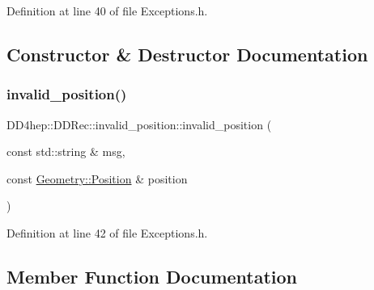 Definition at line 40 of file Exceptions.\+h.



\subsection{Constructor \& Destructor Documentation}
\hypertarget{class_d_d4hep_1_1_d_d_rec_1_1invalid__position_aa71858d5b379311e9530ceabc0f99455}{}\label{class_d_d4hep_1_1_d_d_rec_1_1invalid__position_aa71858d5b379311e9530ceabc0f99455} 
\subsubsection{\texorpdfstring{invalid\+\_\+position()}{invalid\_position()}}
{\footnotesize\ttfamily D\+D4hep\+::\+D\+D\+Rec\+::invalid\+\_\+position\+::invalid\+\_\+position (\begin{DoxyParamCaption}\item[{const std\+::string \&}]{msg,  }\item[{const \hyperlink{namespace_d_d4hep_1_1_geometry_a55083902099d03506c6db01b80404900}{Geometry\+::\+Position} \&}]{position }\end{DoxyParamCaption})\hspace{0.3cm}{\ttfamily [inline]}}



Definition at line 42 of file Exceptions.\+h.



\subsection{Member Function Documentation}
\hypertarget{class_d_d4hep_1_1_d_d_rec_1_1invalid__position_af04d48b510823d5fd98ebb75a1ed52c0}{}\label{class_d_d4hep_1_1_d_d_rec_1_1invalid__position_af04d48b510823d5fd98ebb75a1ed52c0} 

